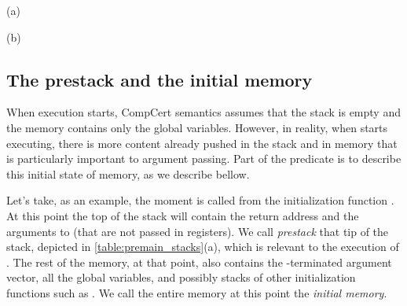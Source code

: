 \begin{table}\centering
\begin{multicols}{2}

(a)


(b)
\end{multicols}
\caption{Entry simulation diagrams. (a) if $s_1$ is an initial state for the source program, then there exists some state $s_2$ that is related to $s_1$ and is an initial state for the compiled program. (b) Just like the diagram for initial states, but it generalizes and exposes the initial memory $m_0$, the entry function $f$ and the arguments . The entire simulation is parametric on the realation $\sim$.}\label{table:initial_sim}
\end{table}

\subsection{The prestack and the initial memory}

When execution starts, CompCert semantics assumes that the stack is empty and the memory contains only the global variables. However, in reality, when  starts executing, there is more content already pushed in the stack and in memory that is particularly important to argument passing. Part of the  predicate is to describe this initial state of memory, as we describe bellow.

Let's take, as an example, the moment \main is called from the initialization function . At this point the top of the stack will contain the return address and the arguments to \main (that are not passed in registers). We call \emph{prestack} that tip of the stack, depicted in \autoref{table:premain_stacks}(a), which is relevant to the execution of \main. The rest of the memory, at that point, also contains the -terminated argument vector, all the global variables, and possibly stacks of other initialization functions such as . We call the entire memory at this point the \emph{initial memory}. 


